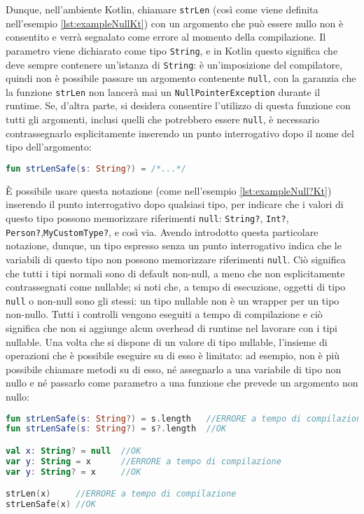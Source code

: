 Dunque, nell'ambiente Kotlin, chiamare \texttt{strLen} (così come viene definita nell'esempio \ref{lst:exampleNullKt}) con un argomento che può essere nullo non è consentito e verrà segnalato come errore al momento della compilazione. Il parametro viene dichiarato come tipo \texttt{String}, e in Kotlin questo significa che deve sempre contenere un'istanza di \texttt{String}: è un’imposizione del compilatore, quindi non è possibile passare un argomento contenente \texttt{null}, con la garanzia che la funzione \texttt{strLen} non lancerà mai un \texttt{NullPointerException} durante il runtime. Se, d'altra parte, si desidera consentire l'utilizzo di questa funzione con tutti gli argomenti, inclusi quelli che potrebbero essere \texttt{null}, è necessario contrassegnarlo esplicitamente inserendo un punto interrogativo dopo il nome del tipo dell'argomento:\\

\begin{lstlisting}[caption={Funzione Kotlin null-safe}, captionpos=b, label={lst:exampleNull?Kt}, language=Kotlin]
fun strLenSafe(s: String?) = /*...*/
\end{lstlisting}

È possibile usare questa notazione (come nell'esempio \ref{lst:exampleNull?Kt}) inserendo il punto interrogativo dopo qualsiasi tipo, per indicare che i valori di questo tipo possono memorizzare riferimenti \texttt{null}: \texttt{String?}, \texttt{Int?}, \texttt{Person?},\texttt{MyCustomType?}, e così via. Avendo introdotto questa particolare notazione, dunque, un tipo espresso senza un punto interrogativo indica che le variabili di questo tipo non possono memorizzare riferimenti \texttt{null}. Ciò significa che tutti i tipi normali sono di default non-null, a meno che non esplicitamente contrassegnati come nullable; si noti che, a tempo di esecuzione, oggetti di tipo \texttt{null} o non-null sono gli stessi: un tipo nullable non è un wrapper per un tipo non-nullo. Tutti i controlli vengono eseguiti a tempo di compilazione e ciò significa che non si aggiunge alcun overhead di runtime nel lavorare con i tipi nullable. Una volta che si dispone di un valore di tipo nullable, l'insieme di operazioni che è possibile eseguire su di esso è limitato: ad esempio, non è più possibile chiamare metodi su di esso, né assegnarlo a una variabile di tipo non nullo e né passarlo come parametro a una funzione che prevede un argomento non nullo:\\

\begin{lstlisting}[caption={Alcuni utilizzi delle funzioni definite in precedenza}, captionpos=b, label={lst:exampleNullKtVari}, language=Kotlin]
fun strLenSafe(s: String?) = s.length   //ERRORE a tempo di compilazione
fun strLenSafe(s: String?) = s?.length  //OK

val x: String? = null  //OK
var y: String = x      //ERRORE a tempo di compilazione
var y: String? = x     //OK

strLen(x)     //ERRORE a tempo di compilazione
strLenSafe(x) //OK
\end{lstlisting}

